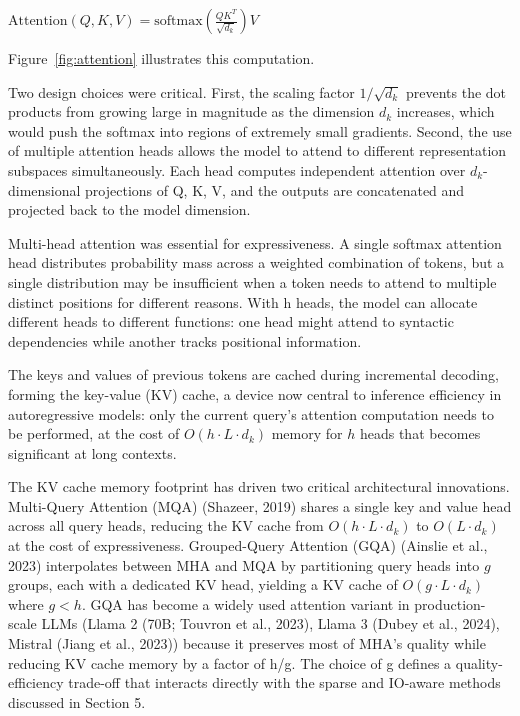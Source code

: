 \documentclass[10pt,twocolumn]{article}
\begin{document}
$\text{Attention}(Q,K,V) = \text{softmax}\left(\frac{QK^T}{\sqrt{d_k}}\right)V$

Figure~\ref{fig:attention} illustrates this computation.

Two design choices were critical. First, the scaling factor $1/\sqrt{d_k}$ prevents the dot products from growing large in magnitude as the dimension $d_k$ increases, which would push the softmax into regions of extremely small gradients. Second, the use of multiple attention heads allows the model to attend to different representation subspaces simultaneously. Each head computes independent attention over $d_k$-dimensional projections of Q, K, V, and the outputs are concatenated and projected back to the model dimension.

Multi-head attention was essential for expressiveness. A single softmax attention head distributes probability mass across a weighted combination of tokens, but a single distribution may be insufficient when a token needs to attend to multiple distinct positions for different reasons. With h heads, the model can allocate different heads to different functions: one head might attend to syntactic dependencies while another tracks positional information.

The keys and values of previous tokens are cached during incremental decoding, forming the key-value (KV) cache, a device now central to inference efficiency in autoregressive models: only the current query's attention computation needs to be performed, at the cost of $O(h \cdot L \cdot d_k)$ memory for $h$ heads that becomes significant at long contexts.

The KV cache memory footprint has driven two critical architectural innovations. Multi-Query Attention (MQA) (Shazeer, 2019) shares a single key and value head across all query heads, reducing the KV cache from $O(h \cdot L \cdot d_k)$ to $O(L \cdot d_k)$ at the cost of expressiveness. Grouped-Query Attention (GQA) (Ainslie et al., 2023) interpolates between MHA and MQA by partitioning query heads into $g$ groups, each with a dedicated KV head, yielding a KV cache of $O(g \cdot L \cdot d_k)$ where $g < h$. GQA has become a widely used attention variant in production-scale LLMs (Llama 2 (70B; Touvron et al., 2023), Llama 3 (Dubey et al., 2024), Mistral (Jiang et al., 2023)) because it preserves most of MHA's quality while reducing KV cache memory by a factor of h/g. The choice of g defines a quality-efficiency trade-off that interacts directly with the sparse and IO-aware methods discussed in Section 5.
\end{document}

